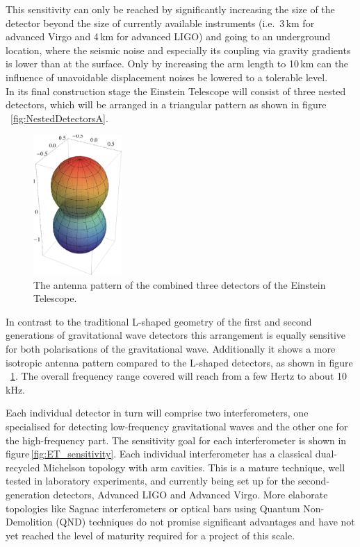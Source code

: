 This sensitivity can only be reached by significantly increasing the size of the 
detector beyond the size of currently available instruments (i.e.\ 3\,km for advanced Virgo 
and 4\,km for advanced LIGO) and going to an underground location, where the seismic 
noise and especially its coupling via gravity gradients is lower than at the surface. Only by increasing the arm length to 10\,km 
can the influence of unavoidable displacement noises be lowered to a tolerable 
level.\\
In its final construction stage the Einstein Telescope will consist of three nested
detectors, which will be arranged in a triangular pattern as shown in 
figure\,~\ref{fig:NestedDetectorsA}. 
\begin{figure}
\vspace{-0.3cm}
	\centering
		\includegraphics[width=0.3\textwidth]{Intro/Intro_Figures/ETAntennaPattern.png}
	\caption{The antenna pattern of the combined three detectors of the Einstein Telescope.}
	\label{fig:AntennaPattern}
	\vspace{-0.5cm}
\end{figure}
In contrast to the traditional L-shaped geometry of the first and second generations 
of gravitational wave detectors this arrangement is equally sensitive for both 
polarisations of the gravitational wave. Additionally it shows a more isotropic 
antenna pattern compared to the L-shaped detectors, as shown in 
figure\,~\ref{fig:AntennaPattern}. The overall frequency range covered will reach from 
a few Hertz to about 10\,kHz.

Each individual detector in turn will comprise two interferometers, one 
specialised for detecting low-frequency gravitational waves and the other one 
for the high-frequency part. The sensitivity goal for each interferometer is shown 
in figure\,\ref{fig:ET_sensitivity}. %
Each individual interferometer has a classical dual-recycled Michelson topology 
with arm cavities. This is a mature technique, well tested in laboratory 
experiments, and currently being set up for the second-generation detectors, 
Advanced LIGO and Advanced Virgo. More elaborate topologies like Sagnac 
interferometers or optical bars using Quantum Non-Demolition (QND) techniques 
do not promise significant advantages and have not yet reached the level of 
maturity required for a project of this scale.\\

